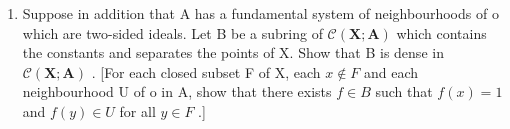 \begin{enumerate}
\def\labelenumi{\alph{enumi})}
\setcounter{enumi}{1}
\tightlist
\item
  Suppose in addition that A has a fundamental system of neighbourhoods of o which are two-sided ideals. Let B be a subring of \(\mathcal{C}(\mathbf{X};\mathbf{A})\) which contains the constants and separates the points of X. Show that B is dense in \(\mathcal{C}(\mathbf{X};\mathbf{A})\) . {[}For each closed subset F of X, each \(x\notin F\) and each neighbourhood U of o in A, show that there exists \(f\in B\) such that \(f(x)=1\) and \(f(y)\in U\) for all \(y\in F\) .{]}
\end{enumerate}

